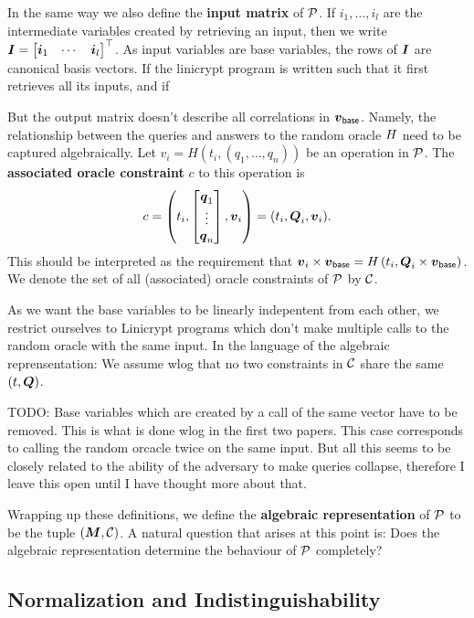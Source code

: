 In the same way we also define the \textbf{input matrix} of $\P$.
If $i_1, \dots, i_l$ are the intermediate variables created by retrieving an input,
then we write
$\Inp = \begin{bmatrix}\v i_1 & \cdots &\v i_l\end{bmatrix}^\top$.
As input variables are base variables,
the rows of $\Inp$ are canonical basis vectors.
If the linicrypt program is written such that it first retrieves all its inputs,
and if 

But the output matrix doesn't describe all correlations in $\vbase$.
Namely, the relationship between the queries and answers to the random oracle $\H$ need to be captured algebraically.
Let $v_i = H(t_i, (q_1, \dots, q_n))$ be an operation in $\P$.
The \textbf{associated oracle constraint} $c$ to this operation is
\[
  c = \left( t_i, \begin{bmatrix}
  \v q_1 \\
  \vdots \\
  \v q_n
  \end{bmatrix},
  \v v_i \right)
	=
	(t_i, \Q_i, \v v_i)
	.
\]
This should be interpreted as the requirement that
$
\v v_i \times \vbase = \H \left( t_i, \Q_i \times \vbase \right)
$.
We denote the set of all (associated) oracle constraints of $\P$ by $\C$.

As we want the base variables to be linearly indepentent from each other,
we restrict ourselves to Linicrypt programs which don't make multiple calls to the random oracle with the same input.
In the language of the algebraic reprensentation:
We assume wlog that no two constraints in $\C$ share the same $(t, \Q)$.


TODO: Base variables which are created by a call of the same vector have to be removed.
This is what is done wlog in the first two papers.
This case corresponds to calling the random orcacle twice on the same input.
But all this seems to be closely related to the ability of the adversary to make queries collapse,
therefore I leave this open until I have thought more about that.

Wrapping up these definitions,
we define the \textbf{algebraic representation} of $\P$ to be the tuple $(\M, \C)$.
A natural question that arises at this point is:
Does the algebraic representation determine the behaviour of $\P$ completely?

\subsection{Normalization and Indistinguishability}

